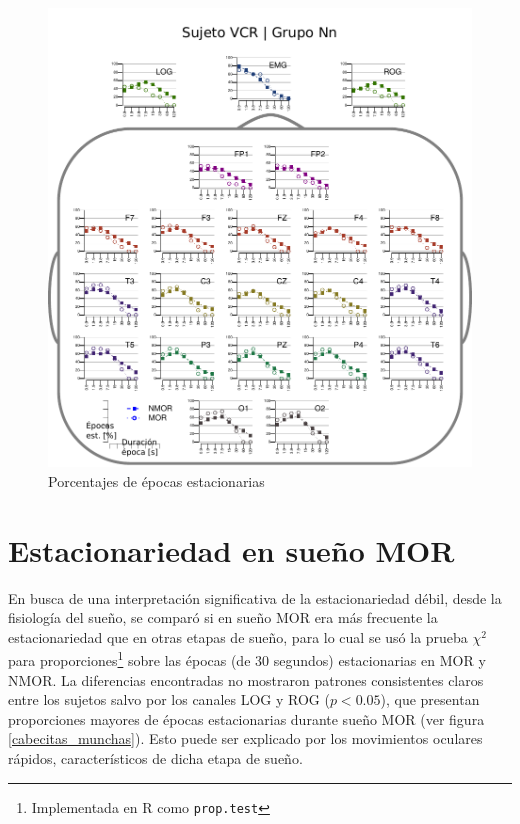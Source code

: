 \begin{figure}
\centering
\includegraphics[width=.9\linewidth]{./img_resultados/cabeza_VCR.pdf}
\caption{Porcentajes de épocas estacionarias}
\label{cabeza_repoio}
\end{figure}

\section{Estacionariedad en sueño MOR}

En busca de una interpretación significativa de la estacionariedad débil, desde la fisiología del
sueño, se comparó si en sueño MOR era más frecuente la estacionariedad que en otras etapas de 
sueño, para lo cual se usó la prueba $\chi^{2}$ para proporciones\footnote{Implementada en R como 
\texttt{prop.test}} sobre las épocas (de 30 segundos) estacionarias en MOR y NMOR.
%
La diferencias encontradas no mostraron patrones consistentes claros entre los sujetos salvo por 
los canales LOG y ROG ($p<0.05$), que presentan proporciones mayores de épocas estacionarias 
durante sueño MOR (ver figura \ref{cabecitas_munchas}). Esto puede ser explicado por los 
movimientos oculares rápidos, característicos de dicha etapa de sueño.
%


